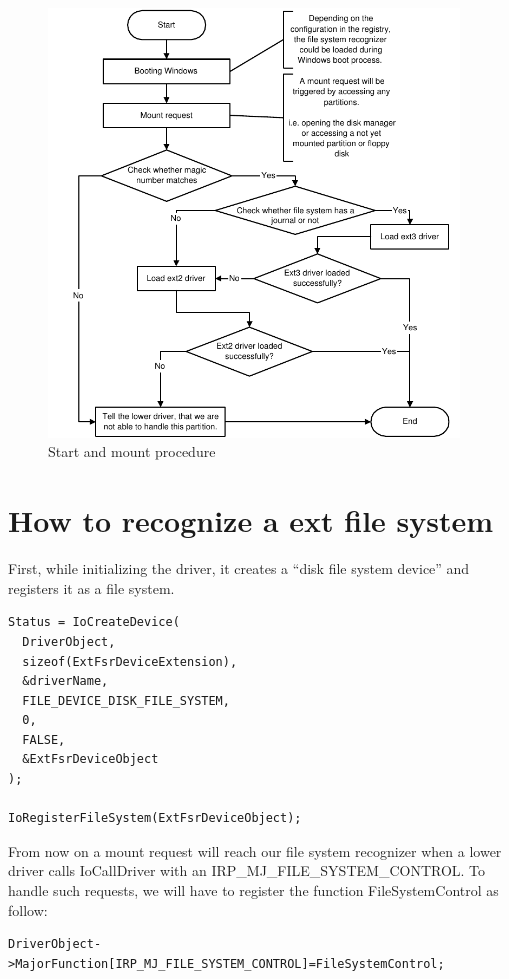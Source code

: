 \begin{figure}[H]
\begin{center}
\includegraphics[width=10.9cm]{./files/inc/pic/techRep_FsRec_Overview}
\end{center}
\caption{\label{fig:techRep_FsRec_Overview}Start and mount procedure}
\end{figure}

\section{How to recognize a ext file system}
First, while initializing the driver, it creates a ``disk file system device'' and registers it as a file system.

\begin{Verbatim}
Status = IoCreateDevice(
  DriverObject,
  sizeof(ExtFsrDeviceExtension),
  &driverName,
  FILE_DEVICE_DISK_FILE_SYSTEM,
  0,
  FALSE,
  &ExtFsrDeviceObject
);

IoRegisterFileSystem(ExtFsrDeviceObject);
\end{Verbatim}

From now on a mount request will reach our file system recognizer when a lower driver calls IoCallDriver with an IRP\_\-MJ\_\-FILE\_\-SYSTEM\_\-CONTROL. To handle such requests, we will have to register the function FileSystemControl as follow:

\begin{Verbatim}
DriverObject->MajorFunction[IRP_MJ_FILE_SYSTEM_CONTROL]=FileSystemControl;
\end{Verbatim}

